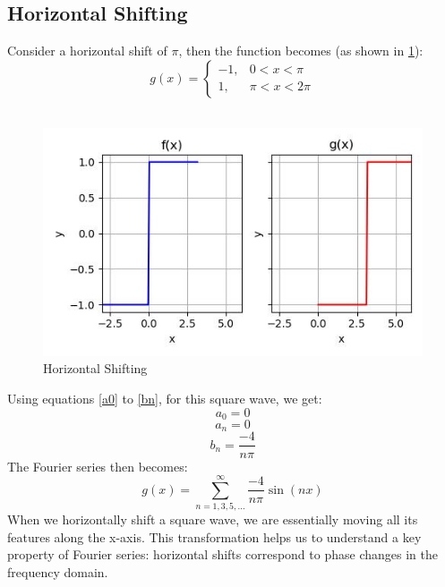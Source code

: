 \documentclass{article}
\begin{document}
\subsection{Horizontal Shifting}
Consider a horizontal shift of $\pi$, then the function becomes (as shown in \ref{fig: horizontal shift}):
\begin{equation}
g(x) = 
\begin{cases} 
-1, & 0 < x < \pi \\
1, & \pi < x < 2\pi
\end{cases}
\end{equation}\\
\begin{figure}
    \centering
    \includegraphics[width=\textwidth]{horizontal_shift.jpg}
    \caption{Horizontal Shifting}
    \label{fig: horizontal shift}
\end{figure}
Using equations \ref{a0} to \ref{bn}, for this square wave, we get:
    \begin{equation}
    a_0 = 0
    \end{equation}
    \begin{equation}
    a_n = 0
    \end{equation}
    \begin{equation}
    b_n = \frac{-4}{n\pi}
    \end{equation}
The Fourier series then becomes:
\begin{equation}
g(x) = \sum_{n=1,3,5,...}^{\infty} \frac{-4}{n\pi} \sin\left(nx\right)
\end{equation}
When we horizontally shift a square wave, we are essentially moving all its features along the x-axis. This transformation helps us to understand a key property of Fourier series: horizontal shifts correspond to phase changes in the frequency domain.
\end{document}
